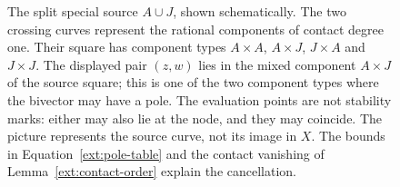 \begin{figure}[H]
\centering
{}
\caption{The split special source $A\cup J$, shown schematically.
The two crossing curves represent the rational components of contact
degree one. Their square has component types $A\times A$, $A\times J$,
$J\times A$ and $J\times J$.
The displayed pair $(z,w)$ lies in the mixed component $A\times J$
of the source square; this is one of the two component types where
the bivector may have a pole. The evaluation points are not stability
marks: either may also lie at the node, and they may coincide.
The picture represents the source curve, not its image in $X$.
The bounds in Equation~\eqref{ext:pole-table} and the contact vanishing
of Lemma~\ref{ext:contact-order} explain the cancellation.}
\label{fig:unmarked-boundary}
\end{figure}
